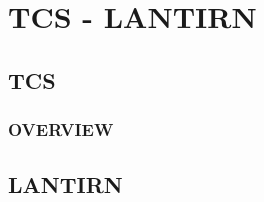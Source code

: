 \chapter{TCS - LANTIRN}
\minitoc
\cleardoublepage

\section{TCS}

\subsection{OVERVIEW}

\cleardoublepage

\section{LANTIRN}


